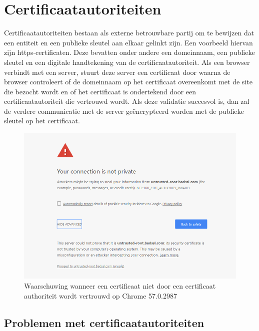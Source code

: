 \chapter{Certificaatautoriteiten}
\label{ch:certificaatautoriteiten}

Certificaatautoriteiten bestaan als externe betrouwbare partij om te bewijzen
dat een entiteit en een publieke sleutel aan elkaar gelinkt zijn. Een voorbeeld
hiervan zijn https-certificaten. Deze bevatten onder andere een domeinnaam, een
publieke sleutel en een digitale handtekening van de certificaatautoriteit. Als
een browser verbindt met een server, stuurt deze server een certificaat door
waarna de browser controleert of de domeinnaam op het certificaat overeenkomt
met de site die bezocht wordt en of het certificaat is ondertekend door een
certificaatautoriteit die vertrouwd wordt. Als deze validatie succesvol is, dan
zal de verdere communicatie met de server geëncrypteerd worden met de publieke
sleutel op het certificaat.

\begin{figure}[H]
	\includegraphics[width=\textwidth,height=\textheight,keepaspectratio]{img/untrusted-root-chrome.png}
	\centering
	\caption{Waarschuwing wanneer een certificaat niet door een certificaat
		authoriteit wordt vertrouwd op Chrome 57.0.2987}
	\label{fig:untrusted-root-chrome}
\end{figure}

\section{Problemen met certificaatautoriteiten}
\label{sec:problemen-met-certificaatautoriteiten}

